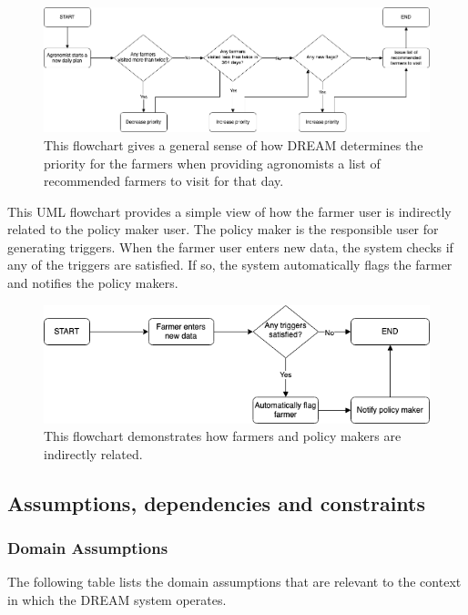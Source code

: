 \begin{figure}[hbt!]
\includegraphics[scale=0.4]{../images_diagrams/adjustvisitpriority.png}
\caption{\label{fig:addOne{figure_counter}}This flowchart gives a general sense of how DREAM determines the priority for the farmers when providing agronomists a list of recommended farmers to visit for that day.}
\end{figure}

\newpage

\begin{flushleft}
This UML flowchart provides a simple view of how the farmer user is indirectly related to the policy maker user. The policy maker is the responsible user for generating triggers. When the farmer user enters new data, the system checks if any of the triggers are satisfied. If so, the system automatically flags the farmer and notifies the policy makers. 
\end{flushleft}


\begin{figure}[hbt!]
\includegraphics[scale=0.4]{../images_diagrams/newfarmerdata_trigger.png}
\caption{\label{fig:addOne{figure_counter}}This flowchart demonstrates how farmers and policy makers are indirectly related.}

\end{figure}


\subsection{Assumptions, dependencies and constraints}
\subsubsection{Domain Assumptions}
\begin{flushleft}
The following table lists the domain assumptions that are relevant to the context in which the DREAM system operates. 
\end{flushleft} 

\begin{flushleft}

\end{flushleft}

